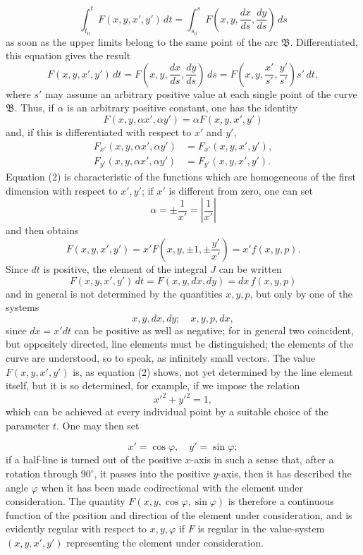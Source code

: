 \documentclass[11pt,a4paper,leqno]{article}
\begin{document}
\[
 \int_{t_0}^{t}F(x,y,x',y')\,dt
 =\int_{s_0}^{s}F\left(x,y,\frac{dx}{ds},\frac{dy}{ds}\right)\,ds
\]
as soon as the upper limits belong to the same point of the arc $\mathfrak{B}$. Differentiated, this equation gives the result
\[
 F(x,y,x',y')\,dt
 =F\left(x,y,\frac{dx}{ds},\frac{dy}{ds}\right)\,ds
 =F\left(x,y,\frac{x'}{s'},\frac{y'}{s'}\right)s'\,dt,
\]
where $s'$ may assume an arbitrary positive value at each single point of the curve $\mathfrak{B}$. Thus, if $\alpha$ is an arbitrary positive constant, one has the identity
\begin{equation}\tag{2}
 F(x,y,\alpha x',\alpha y')=\alpha F(x,y,x',y')
\end{equation}
and, if this is differentiated with respect to $x'$ and $y'$,
\begin{equation}\tag{3}
\begin{aligned}
 F_{x'}(x,y,\alpha x',\alpha y')&=F_{x'}(x,y,x',y'),\\
 F_{y'}(x,y,\alpha x',\alpha y')&=F_{y'}(x,y,x',y').
\end{aligned}
\end{equation}
Equation (2) is characteristic of the functions which are homogeneous of the first dimension with respect to $x',y'$; if $x'$ is different from zero, one can set
\[
 \alpha=\pm\frac{1}{x'}=\left|\frac{1}{x'}\right|
\]
and then obtains
\[
 F(x,y,x',y')=x'F\left(x,y,\pm1,\pm\frac{y'}{x'}\right)=x'f(x,y,p).
\]
Since $dt$ is positive, the element of the integral $J$ can be written
\[
 F(x,y,x',y')\,dt=F(x,y,dx,dy)=dx\,f(x,y,p)
\]
and in general is not determined by the quantities $x,y,p$, but only by one of the systems
\[
 x,y,dx,dy;\quad x,y,p,dx,
\]
since $dx=x'dt$ can be positive as well as negative; for in general two coincident, but oppositely directed, line elements must be distinguished; the elements of the curve are understood, so to speak, as infinitely small vectors. The value $F(x,y,x',y')$ is, as equation (2) shows, not yet determined by the line element itself, but it is so determined, for example, if we impose the relation
\[
 x'^2+y'^2=1,
\]
which can be achieved at every individual point by a suitable choice of the parameter $t$. One may then set

\[
 x'=\cos\varphi,\quad y'=\sin\varphi;
\]
if a half-line is turned out of the positive $x$-axis in such a sense that, after a rotation through $90^\circ$, it passes into the positive $y$-axis, then it has described the angle $\varphi$ when it has been made codirectional with the element under consideration. The quantity $F(x,y,\cos\varphi,\sin\varphi)$ is therefore a continuous function of the position and direction of the element under consideration, and is evidently regular with respect to $x,y,\varphi$ if $F$ is regular in the value-system $(x,y,x',y')$ representing the element under consideration.
\end{document}

